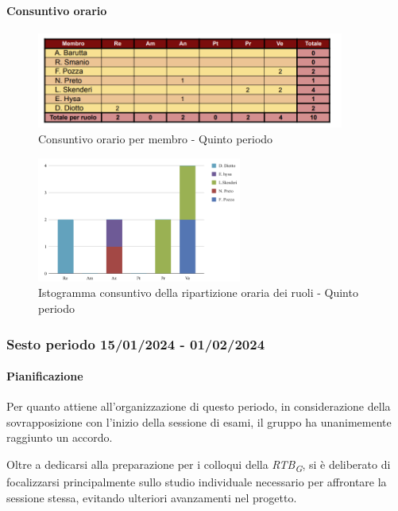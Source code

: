 \paragraph{Consuntivo orario}

\begin{figure}[H]
    \centering
    \includegraphics[width=0.9\textwidth]{../Images/tabCons5.png}
    \caption{Consuntivo orario per membro - Quinto periodo}
    \label{fig:Constuntivo_orario_5}
\end{figure}

\begin{figure}[H]
    \centering
    \includegraphics[width=0.6\textwidth]{../Images/graficoConsPrev5.png}
    \caption{Istogramma consuntivo della ripartizione oraria dei ruoli - Quinto periodo}
    \label{fig:Consuntivo_ripartizione_oraria_5}
\end{figure}


\subsubsection{Sesto periodo  15/01/2024 - 01/02/2024}
\paragraph{Pianificazione}
Per quanto attiene all'organizzazione di questo periodo, in considerazione della sovrapposizione con l'inizio della sessione di esami, il gruppo ha unanimemente raggiunto un accordo.

Oltre a dedicarsi alla preparazione per i colloqui della \textit{RTB}\textsubscript{\textit{G}}, si è deliberato di focalizzarsi principalmente sullo studio individuale necessario per affrontare la sessione stessa, evitando ulteriori avanzamenti nel progetto.

